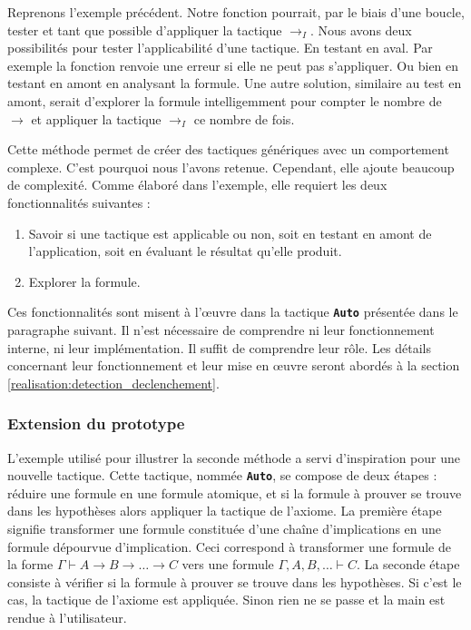 \documentclass[french,titlepage]{article}
\newcommand{\textttbf}[1]{\texttt{\textbf{#1}}}
\begin{document}
Reprenons l'exemple précédent. Notre fonction pourrait, par le biais d'une boucle, tester et tant que possible d'appliquer la tactique $\to_I$. Nous avons deux possibilités pour tester l'applicabilité d'une tactique. En testant en aval. Par exemple la fonction renvoie une erreur si elle ne peut pas s'appliquer. Ou bien en testant en amont en analysant la formule. Une autre solution, similaire au test en amont, serait d'explorer la formule intelligemment pour compter le nombre de $\to$ et appliquer la tactique $\to_I$ ce nombre de fois.


Cette méthode permet de créer des tactiques génériques avec un comportement complexe. C'est pourquoi nous l'avons retenue. Cependant, elle ajoute beaucoup de complexité. Comme élaboré dans l'exemple, elle requiert les deux fonctionnalités suivantes :
\begin{enumerate}
    \item Savoir si une tactique est applicable ou non, soit en testant en amont de l'application, soit en évaluant le résultat qu'elle produit.
    \item Explorer la formule.
\end{enumerate}
Ces fonctionnalités sont misent à l'œuvre dans la tactique \textttbf{Auto} présentée dans le paragraphe suivant. Il n'est nécessaire de comprendre ni leur fonctionnement interne, ni leur implémentation. Il suffit de comprendre leur rôle. Les détails concernant leur fonctionnement et leur mise en œuvre seront abordés à la section \ref{realisation:detection_declenchement}.

\subsubsection{Extension du prototype} \label{realisation:composition_tactiques:extension_proto}
L'exemple utilisé pour illustrer la seconde méthode a servi d'inspiration pour une nouvelle tactique. Cette tactique, nommée \textttbf{Auto}, se compose de deux étapes : réduire une formule en une formule atomique, et si la formule à prouver se trouve dans les hypothèses alors appliquer la tactique de l'axiome. La première étape signifie transformer une formule constituée d'une chaîne d'implications en une formule dépourvue d'implication. Ceci correspond à transformer une formule de la forme $\Gamma \vdash A \to B \to \dots \to C $ vers une formule $\Gamma, A, B, \dots \vdash C$. La seconde étape consiste à vérifier si la formule à prouver se trouve dans les hypothèses. Si c'est le cas, la tactique de l'axiome est appliquée. Sinon rien ne se passe et la main est rendue à l'utilisateur.
\end{document}
